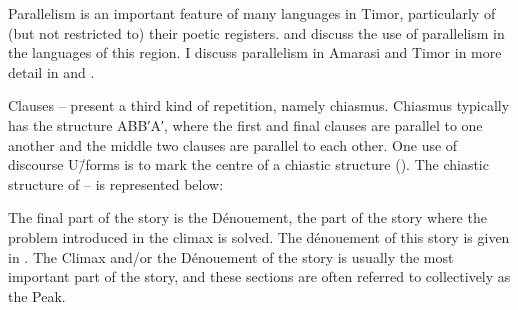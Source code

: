 Parallelism is an important feature of many languages in Timor,
particularly of (but not restricted to) their poetic registers.
\citet{fo88,fo14} and \citet[15ff]{grth97}
discuss the use of parallelism in the languages of this region.
I discuss parallelism in Amarasi and Timor
in more detail in  and .

Clauses --
present a third kind of repetition, namely chiasmus.
Chiasmus typically has the structure ABB′A′,
where the first and final clauses are parallel to one another
and the middle two clauses are parallel to each other.
One use of discourse U\=/forms is to mark the centre of a chiastic structure ().
The chiastic structure of --
is represented below:

\begin{exe}
\end{exe}

The final part of the story is the Dénouement, the part of the
story where the problem introduced in the climax is solved.
The dénouement of this story is given in .
The Climax and/or the Dénouement of the story is usually the most important
part of the story, and these sections are often referred to collectively as the Peak.

